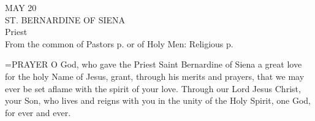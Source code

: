 \begin{center}\normalsize MAY 20\\
\footnotesize ST. BERNARDINE OF SIENA\\
\footnotesize Priest\\
\footnotesize From the common of Pastors p.    or of Holy Men: Religious p. \\
\end{center}

\hangindent=\parindent \small{PRAYER 
O God, who gave the Priest Saint Bernardine of Siena
a great love for the holy Name of Jesus,
grant, through his merits and prayers,
that we may ever be set aflame
with the spirit of your love. Through our Lord Jesus Christ, your Son,
who lives and reigns with you in the unity of the Holy Spirit,
one God, for ever and ever.\\}
 

